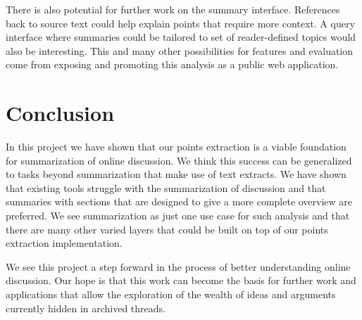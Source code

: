     There is also potential for further work on the summary interface. References back to source text could help explain points that require more context. A query interface where summaries could be tailored to set of reader-defined topics would also be interesting. This and many other possibilities for features and evaluation come from exposing and promoting this analysis as a public web application.

  \section{Conclusion}
    In this project we have shown that our points extraction is a viable foundation for summarization of online discussion. We think this success can be generalized to tasks beyond summarization that make use of text extracts. We have shown that existing tools struggle with the summarization of discussion and that summaries with sections that are designed to give a more complete overview are preferred. We see summarization as just one use case for such analysis and that there are many other varied layers that could be built on top of our points extraction implementation.

    We see this project a step forward in the process of better understanding online discussion. Our hope is that this work can become the basis for further work and applications that allow the exploration of the wealth of ideas and arguments currently hidden in archived threads.
